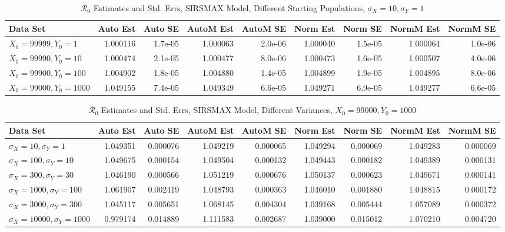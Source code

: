 \documentclass[12pt]{article}
\newcommand{\rr}{\ensuremath{\mathcal{R}_0}}
\begin{document}
\begin{table}[H]
	
	\caption{$\rr$ Estimates and Std. Errs, SIRSMAX Model,
		Different Starting Populations, 
		$\sigma_X = 10, \sigma_Y = 1$}
	\begin{footnotesize}
		\hskip -1.7cm
		\begin{tabular}{l|r|r|r|r|r|r|r|r}
			\hline
			Data Set & Auto Est & Auto SE & AutoM Est & AutoM SE & Norm Est & Norm SE & NormM Est & NormM SE\\
			\hline
			$X_0 = 99999, Y_0 = 1$ & 1.000116 & 1.7e-05 & 1.000063 & 2.0e-06 & 1.000040 & 1.5e-05 & 1.000064 & 1.0e-06\\
			\hline
			$X_0 = 99990, Y_0 = 10$ & 1.000474 & 2.1e-05 & 1.000477 & 8.0e-06 & 1.000473 & 1.6e-05 & 1.000507 & 4.0e-06\\
			\hline
			$X_0 = 99900, Y_0 = 100$ & 1.004902 & 1.8e-05 & 1.004880 & 1.4e-05 & 1.004899 & 1.9e-05 & 1.004895 & 8.0e-06\\
			\hline
			$X_0 = 99000, Y_0 = 1000$ & 1.049155 & 7.4e-05 & 1.049349 & 6.6e-05 & 1.049271 & 6.9e-05 & 1.049277 & 6.6e-05\\
			\hline
		\end{tabular}
	\end{footnotesize}
\end{table}

\begin{table}[H]
	
	\caption{$\rr$ Estimates and Std. Errs, SIRSMAX Model,
		Different Variances, 
		$X_0 = 99000, Y_0 = 1000$}
	\begin{footnotesize}
		\hskip -1.7cm
		\begin{tabular}{l|r|r|r|r|r|r|r|r}
			\hline
			Data Set & Auto Est & Auto SE & AutoM Est & AutoM SE & Norm Est & Norm SE & NormM Est & NormM SE\\
			\hline
			$\sigma_X = 10, \sigma_Y = 1$ & 1.049351 & 0.000076 & 1.049219 & 0.000065 & 1.049294 & 0.000069 & 1.049283 & 0.000069\\
			\hline
			$\sigma_X = 100, \sigma_Y = 10$ & 1.049675 & 0.000154 & 1.049504 & 0.000132 & 1.049443 & 0.000182 & 1.049389 & 0.000131\\
			\hline
			$\sigma_X = 300, \sigma_Y = 30$ & 1.046190 & 0.000566 & 1.051219 & 0.000676 & 1.050137 & 0.000623 & 1.049671 & 0.000141\\
			\hline
			$\sigma_X = 1000, \sigma_Y = 100$ & 1.061907 & 0.002419 & 1.048793 & 0.000363 & 1.046010 & 0.001880 & 1.048815 & 0.000172\\
			\hline
			$\sigma_X = 3000, \sigma_Y = 300$ & 1.045117 & 0.005651 & 1.068145 & 0.004304 & 1.039168 & 0.005444 & 1.057089 & 0.000372\\
			\hline
			$\sigma_X = 10000, \sigma_Y = 1000$ & 0.979174 & 0.014889 & 1.111583 & 0.002687 & 1.039000 & 0.015012 & 1.070210 & 0.004720\\
			\hline
		\end{tabular}
	\end{footnotesize}
\end{table}
\end{document}
